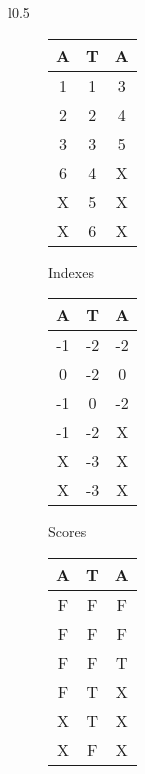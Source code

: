 \documentclass{article}
\begin{document}
\begin{wrapfigure}{l}{0.5\textwidth}
  \begin{subfigure}[t]{0.49\textwidth}
    \begin{center}
      \begin{tabular}{|c|c|c|}
        A & T & A \\ \hline 
        1 & 1 & 3 \\ \hline
        2 & 2 & 4 \\ \hline
        3 & 3 & 5 \\ \hline
        6 & 4 & X \\ \hline
        X & 5 & X \\ \hline
        X & 6 & X \\ \hline
      \end{tabular}
    \end{center}
    \caption{Indexes}
  \end{subfigure}
  \begin{subfigure}[t]{0.49\textwidth}
    \begin{center}
      \begin{tabular}{|c|c|c|}
        A & T & A \\ \hline 
       -1 & -2 & -2 \\ \hline
        0 & -2 & 0 \\ \hline
        -1 & 0 & -2 \\ \hline
        -1 & -2 & X \\ \hline
        X & -3 & X \\ \hline
        X & -3 & X \\ \hline
      \end{tabular}
    \end{center}
    \caption{Scores}
  \end{subfigure}
  \begin{subfigure}[b]{0.49\textwidth}
    \begin{center}
      \begin{tabular}{|c|c|c|}
        A & T & A \\ \hline 
        F & F & F \\ \hline
        F & F & F \\ \hline
        F & F & T \\ \hline
        F & T & X \\ \hline
        X & T & X \\ \hline
        X & F & X \\ \hline
      \end{tabular}
    \end{center}

\end{subfigure}
\end{wrapfigure}
\end{document}
